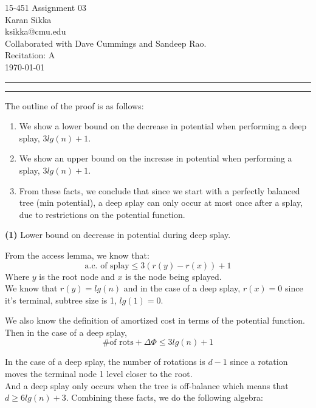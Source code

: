 \documentclass[11pt]{article}
\makeatletter
\newcommand{\question}[2] {\vspace{.25in} \hrule\vspace{0.5em}
\noindent{\bf #1: #2} \vspace{0.5em}
\hrule \vspace{.10in}}
\renewcommand{\part}[1] {\vspace{.10in} {\bf (#1)}}
\newcommand{\myname}{Karan Sikka}
\newcommand{\myandrew}{ksikka@cmu.edu}
\newcommand{\myhwnum}{03}
\makeatother
\begin{document}
\medskip

\thispagestyle{plain}
\begin{center}
{\Large 15-451 Assignment \myhwnum} \\
\myname \\
\myandrew \\
Collaborated with Dave Cummings and Sandeep Rao.\\
Recitation: A \\
\today \\
\end{center}

\question{1}{Balanced Splay Trees}

The outline of the proof is as follows:

\begin{enumerate}
\item We show a lower bound on the decrease in potential when performing a deep splay, $3 lg(n) + 1$.
\item We show an upper bound on the increase in potential when performing a splay, $3 lg(n) + 1$.
\item From these facts, we conclude that since we start with a perfectly balanced tree (min potential), a deep splay can only occur at most once after a splay, due to restrictions on the potential function.
\end{enumerate}

\part{1} Lower bound on decrease in potential during deep splay.

From the access lemma, we know that:
$$ \text{a.c. of splay} \leq 3 (r(y) - r(x)) + 1$$
Where $y$ is the root node and $x$ is the node being splayed.\\
We know that $r(y) = lg(n)$ and in the case of a deep splay, $r(x) = 0$ since it's terminal, subtree size is 1, $lg(1) = 0$.

We also know the definition of amortized cost in terms of the potential function. Then in the case of a deep splay,
$$ \text{\# of rots} + \Delta \Phi \leq 3 lg(n) + 1$$

In the case of a deep splay, the number of rotations is $d - 1$ since a rotation moves the terminal node 1 level closer to the root.\\
And a deep splay only occurs when the tree is off-balance which means that $d \geq 6 lg(n) + 3$. Combining these facts, we do the following algebra:
\end{document}
